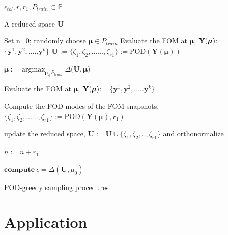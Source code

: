 \documentclass[]{interact}
\DeclareMathOperator{\argmaxH}{argmax}
\theoremstyle{plain}%
\theoremstyle{definition}
\theoremstyle{remark}
\begin{document}
\begin{algorithm}[H]
	
	\begin{algorithmic}
		
		\REQUIRE $\epsilon_{tol}, r, r_1, P_{train} \subset \mathbb P$ 
		
		\ENSURE A reduced space $\textbf{U}$
		
		\STATE Set n=0; randomly choose $\boldsymbol{\mu}\in P_{train}$
		\STATE Evaluate the FOM at $\boldsymbol{\mu}$, $\textbf Y(\boldsymbol{\mu})$:= $\{\textbf{y}^1, \textbf{y}^2, ..... \textbf{y}^k\}$
		\STATE $\mathbf{U} := \{\zeta_1, \zeta_2, ......,\zeta_{r1}\} := \text{POD}(\textbf{Y}(\boldsymbol{\mu}))$
		
		\STATE $\boldsymbol{\mu} := \argmaxH_{\boldsymbol{\mu}_\in P_{train}} \Delta(\textbf{U}, \boldsymbol{\mu)}$
		
		\STATE Evaluate the FOM at $\boldsymbol{\mu}$, $\textbf Y(\boldsymbol{\mu})$:= $\{\textbf{y}^1, \textbf{y}^2, ..... \textbf{y}^k\}$ 
		
		\STATE Compute the POD modes of the FOM snapshots, $\{\zeta_1, \zeta_2, ......,\zeta_{r1}\} := \text{POD}(\textbf{Y}(\boldsymbol{\mu}), r_1)$
		
%		
		\STATE update the reduced space, $\textbf{U} := \textbf{U} \cup \{\zeta_1, \zeta_2, ..,\zeta_{r1}\} $ and orthonormalize
		
		\STATE $n:=n+r_1$
		
		\STATE $ \textbf{compute} ~\epsilon = \Delta(\textbf{U}, \mu_0)$
		
		\ENDWHILE
		
	\end{algorithmic}
	
	\caption{POD-greedy sampling procedures}
	
	\label{alg:greedy pod}
	
\end{algorithm}

\section{Application}
\end{document}
